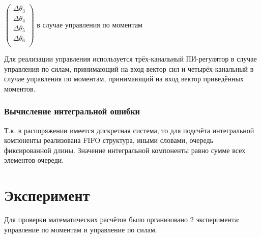 \documentclass[a4paper,14pt,russian]{extreport} \usepackage{extsizes}
\begin{document}
		$\begin{pmatrix}
		\Delta \theta_{3}\\ \Delta \theta_{4} \\ \Delta \theta_{5} \\ \Delta \theta_{6} \\ \end{pmatrix} $ в случае управления по моментам
		
		Для реализации управления используется трёх-канальный ПИ-регулятор в случае управления по силам, принимающий на вход вектор сил и четырёх-канальный в случае управления по моментам, принимающий на вход вектор приведённых моментов.
		\subsection{Вычисление интегральной ошибки}
		Т.к. в распоряжении имеется дискретная система, то для подсчёта интегральной компоненты реализована FIFO структура, иными словами, очередь фиксированной длины. Значение интегральной компоненты равно сумме всех элементов очереди.
		
			\chapter{Эксперимент}
			Для проверки математических расчётов было организовано 2 эксперимента: управление по моментам и управление по силам.	
\end{document}
